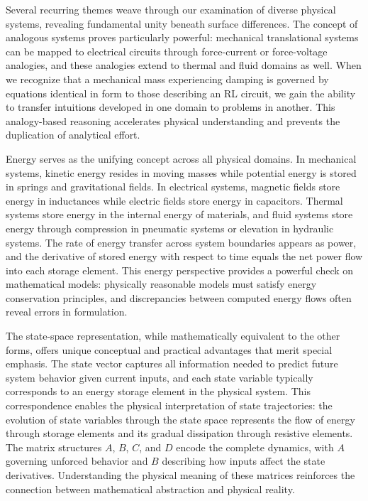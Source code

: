 Several recurring themes weave through our examination of diverse physical systems, revealing fundamental unity beneath surface differences. The concept of analogous systems proves particularly powerful: mechanical translational systems can be mapped to electrical circuits through force-current or force-voltage analogies, and these analogies extend to thermal and fluid domains as well. When we recognize that a mechanical mass experiencing damping is governed by equations identical in form to those describing an RL circuit, we gain the ability to transfer intuitions developed in one domain to problems in another. This analogy-based reasoning accelerates physical understanding and prevents the duplication of analytical effort.

Energy serves as the unifying concept across all physical domains. In mechanical systems, kinetic energy resides in moving masses while potential energy is stored in springs and gravitational fields. In electrical systems, magnetic fields store energy in inductances while electric fields store energy in capacitors. Thermal systems store energy in the internal energy of materials, and fluid systems store energy through compression in pneumatic systems or elevation in hydraulic systems. The rate of energy transfer across system boundaries appears as power, and the derivative of stored energy with respect to time equals the net power flow into each storage element. This energy perspective provides a powerful check on mathematical models: physically reasonable models must satisfy energy conservation principles, and discrepancies between computed energy flows often reveal errors in formulation.

The state-space representation, while mathematically equivalent to the other forms, offers unique conceptual and practical advantages that merit special emphasis. The state vector captures all information needed to predict future system behavior given current inputs, and each state variable typically corresponds to an energy storage element in the physical system. This correspondence enables the physical interpretation of state trajectories: the evolution of state variables through the state space represents the flow of energy through storage elements and its gradual dissipation through resistive elements. The matrix structures $A$, $B$, $C$, and $D$ encode the complete dynamics, with $A$ governing unforced behavior and $B$ describing how inputs affect the state derivatives. Understanding the physical meaning of these matrices reinforces the connection between mathematical abstraction and physical reality.

